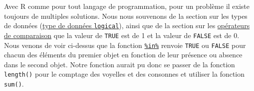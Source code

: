 \documentclass[
]{book}
\newenvironment{Shaded}{\begin{snugshade}}{\end{snugshade}}
\newcommand{\CommentTok}[1]{\textcolor[rgb]{0.56,0.35,0.01}{\textit{#1}}}
\newcommand{\ControlFlowTok}[1]{\textcolor[rgb]{0.13,0.29,0.53}{\textbf{#1}}}
\newcommand{\DataTypeTok}[1]{\textcolor[rgb]{0.13,0.29,0.53}{#1}}
\newcommand{\DecValTok}[1]{\textcolor[rgb]{0.00,0.00,0.81}{#1}}
\newcommand{\KeywordTok}[1]{\textcolor[rgb]{0.13,0.29,0.53}{\textbf{#1}}}
\newcommand{\NormalTok}[1]{#1}
\newcommand{\OperatorTok}[1]{\textcolor[rgb]{0.81,0.36,0.00}{\textbf{#1}}}
\newcommand{\StringTok}[1]{\textcolor[rgb]{0.31,0.60,0.02}{#1}}
\begin{document}
Avec R comme pour tout langage de programmation, pour un problème il existe toujours de multiples solutions. Nous nous souvenons de la section sur les types de données (\protect\hyperlink{l013logi}{type de données \texttt{logical}}), ainsi que de la section sur les \protect\hyperlink{l011opcomp}{opérateurs de comparaison} que la valeur de \texttt{TRUE} est de 1 et la valeur de \texttt{FALSE} est de 0. Nous venons de voir ci-dessus que la fonction \protect\hyperlink{l015in}{\texttt{\%in\%}} renvoie \texttt{TRUE} ou \texttt{FALSE} pour chacun des éléments du premier objet en fonction de leur présence ou absence dans le second objet. Notre fonction aurait pu donc se passer de la fonction \texttt{length()} pour le comptage des voyelles et des consonnes et utiliser la fonction \texttt{sum()}.

\begin{Shaded}
\end{Shaded}
\end{document}
